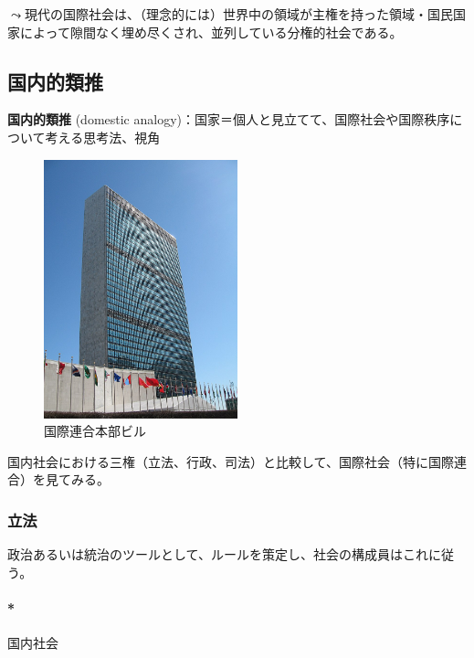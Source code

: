 \documentclass[
  xelatex,
  ja=standard]{bxjsarticle}
\let\oldparagraph\paragraph
\renewcommand{\paragraph}[1]{\oldparagraph{#1}\mbox{}}
\begin{document}
\(\leadsto\)現代の国際社会は、（理念的には）世界中の領域が主権を持った領域・国民国家によって隙間なく埋め尽くされ、並列している分権的社会である。

\hypertarget{ux56fdux5185ux7684ux985eux63a8}{%
\subsection{国内的類推}\label{ux56fdux5185ux7684ux985eux63a8}}

\textbf{国内的類推} (domestic
analogy)：国家＝個人と見立てて、国際社会や国際秩序について考える思考法、視角\citetext{\citealp[p.174]{nakanishi2013}; \citealp[p.39-46]{shinoda2007}}

\begin{figure}[htpb]

{\centering \includegraphics[width=0.5\textwidth,height=\textheight]{international_society_files/mediabag/800px-UNHQ_NYC.jpg}

}

\caption{国際連合本部ビル}

\end{figure}

国内社会における三権（立法、行政、司法）と比較して、国際社会（特に国際連合）を見てみる。

\hypertarget{ux7acbux6cd5}{%
\subsubsection{立法}\label{ux7acbux6cd5}}

政治あるいは統治のツールとして、ルールを策定し、社会の構成員はこれに従う。

\hypertarget{ux56fdux5185ux793eux4f1a}{%
\paragraph*{国内社会}\label{ux56fdux5185ux793eux4f1a}}
\end{document}
